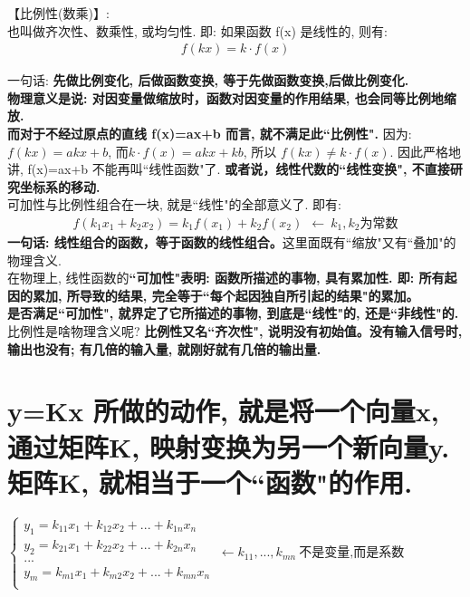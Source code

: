 \documentclass[UTF8]{ctexart}
\begin{document}
【比例性(数乘)】:\\
也叫做齐次性、数乘性, 或均匀性. 即: 如果函数 f(x) 是线性的, 则有:
\begin{align*}
	\boxed{
	f(kx) = k \cdot f(x)	
	}
\end{align*}

一句话: \textbf{先做比例变化, 后做函数变换, 等于先做函数变换,后做比例变化.}\\
\textbf{物理意义是说: 对因变量做缩放时，函数对因变量的作用结果, 也会同等比例地缩放.} \\

\textbf{而对于不经过原点的直线 f(x)=ax+b 而言, 就不满足此``比例性".} 因为: $f(kx) = akx+b$, 而$k\cdot f(x)=akx+kb$, 所以 $f(kx) \neq k \cdot f(x)$. 因此严格地讲, f(x)=ax+b 不能再叫``线性函数"了. \textbf{或者说，线性代数的``线性变换", 不直接研究坐标系的移动.}\\

可加性与比例性组合在一块, 就是``线性"的全部意义了. 即有:
\begin{align*}
f\left( k_1x_1+k_2x_2 \right) =k_1f\left( x_1 \right) +k_2f\left( x_2 \right) \ \ ←\ k_1,k_2\text{为常数}
\end{align*}
\textbf{一句话: 线性组合的函数，等于函数的线性组合。}这里面既有``缩放"又有``叠加"的物理含义.\\

在物理上, 线性函数的\textbf{``可加性"表明: 函数所描述的事物, 具有累加性. 即: 所有起因的累加, 所导致的结果, 完全等于``每个起因独自所引起的结果"的累加。}\\
\textbf{是否满足``可加性", 就界定了它所描述的事物, 到底是``线性"的, 还是``非线性"的.}\\


比例性是啥物理含义呢? \textbf{比例性又名``齐次性", 说明没有初始值。没有输入信号时, 输出也没有; 有几倍的输入量, 就刚好就有几倍的输出量.}



\section{y=Kx 所做的动作, 就是将一个向量x, 通过矩阵K, 映射变换为另一个新向量y. 矩阵K, 就相当于一个``函数"的作用.}

$
\left\{ \begin{array}{l}
	y_1=k_{11}x_1+k_{12}x_2+...+k_{1n}x_n\\
	y_2=k_{21}x_1+k_{22}x_2+...+k_{2n}x_n\\
	...\\
	y_m=k_{m1}x_1+k_{m2}x_2+...+k_{mn}x_n\\
\end{array} \right. \ ←k_{11},...,k_{mn}\ \text{不是变量,而是系数}
$\\
\end{document}
